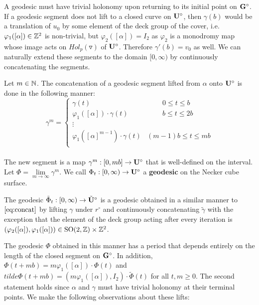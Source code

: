 \documentclass[]{article}
\def\btUs{\btU^\circ}
\def\SO{\mathrm{SO}}
\begin{document}
A geodesic must have trivial holonomy upon returning to its initial point on $\mathbf{G}^\circ$. If a geodesic segment does not lift to a closed curve on $\mathbf{U}^\circ$, then $\gamma(b)$ would be a translation of $u_0$ by some element of the deck group of the cover, i.e. $\varphi_1([\alpha])\in\mathbb{Z}^2$ is non-trivial, but $\varphi_2( [ \alpha] ) =I_2$ as $\varphi_2$ is a monodromy map whose image acts on $Hol_p (\triangledown)$ of $\mathbf{U}^\circ$. Therefore $\gamma'(b)=v_0$ as well. We can naturally extend these segments to the domain $[0,\infty)$ by continuously concatenating the segments.

\begin{Def}
Let $m\in\mathbb{N}$. The concatenation of a geodesic segment lifted from $\alpha$ onto $\mathbf{U}^\circ$ is done in the following manner:\\
\begin{equation}
\gamma^m=
\begin{cases}
\gamma(t)  & ~~~~~~~~~~0\leq  t\leq b\\
\varphi_1([\alpha])\cdot \gamma(t)  & ~~~~~~~~~~b\leq  t\leq 2b\\
\vdots\\
\varphi_1([\alpha]^{m-1})\cdot \gamma(t)  & (m-1)b\leq t\leq mb\\
\end{cases}
\label{eq:concat}
\end{equation}
 \\
The new segment is a map $\gamma^m:[0,mb]\rightarrow\mathbf{U}^\circ$ that is well-defined on the interval. Let $\Phi=\lim\limits_{m\to\infty} \gamma^m$. We call $\Phi_t:[0,\infty)\rightarrow\mathbf{U}^\circ$ a \textbf{geodesic} on the Necker cube surface.
\end{Def}

\begin{Def}
The geodesic $\tilde{\Phi}_t:[0,\infty)\rightarrow\btUs$ is a geodesic obtained in a similar manner to $\eqref{eq:concat}$ by lifting $\gamma$ under $r^\circ$ and continuously concatenating $\tilde{\gamma}$ with the exception that the element of the deck group acting after every iteration is $(\varphi_2([\alpha]),\varphi_1([\alpha]))\in\SO(2,\ZZ)\times \ZZ^2$. 
\end{Def}

The geodesic $\Phi$ obtained in this manner has a period that depends entirely on the length of the closed segment on $\mathbf{G}^\circ$. In addition, $\Phi(t+mb)=m\varphi_1([\alpha])\cdot\Phi(t)$ and $tilde{\Phi}(t+mb)=(m\varphi_1([\alpha]),I_2)\cdot\tilde{\Phi}(t)$  for all $t,m\geq 0$. The second statement holds since $\alpha$ and $\gamma$ must have trivial holonomy at their terminal points. We make the following observations about these lifts:
\end{document}
